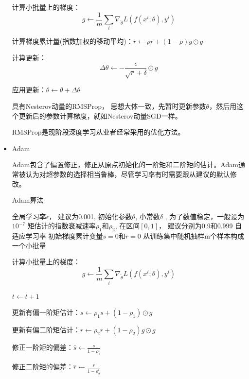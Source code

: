\begin{itemize}
\begin{algorithm}
\begin{algorithmic}
	计算小批量上的梯度：
	\begin{displaymath}
		g \leftarrow \frac{1}{m} \sum_{i}\nabla_{\tilde{\theta}}L(f(x^{i}; \theta), y^{i})
	\end{displaymath}
	
	计算梯度累计量(指数加权的移动平均)：$r \leftarrow \rho r + (1 - \rho) g \odot g$
	
	计算更新：
	\begin{displaymath}
	\Delta \theta \leftarrow - \frac{\epsilon}{\sqrt{r}+\delta} \odot g
	\end{displaymath}
	
	应用更新：$\theta \leftarrow \theta + \Delta \theta $
\end{algorithmic}
\end{algorithm}

具有Nesterov动量的RMSProp， 思想大体一致，先暂时更新参数$\theta$，然后用这个更新后的参数计算梯度，就如Nesterov动量SGD一样。

RMSProp是现阶段深度学习从业者经常采用的优化方法。

\item Adam

Adam包含了偏置修正，修正从原点初始化的一阶矩和二阶矩的估计。Adam通常被认为对超参数的选择相当鲁棒，尽管学习率有时需要跟从建议的默认修改。

\begin{algorithm}
\caption{Adam算法}
\begin{algorithmic}
\Require 全局学习率$\epsilon$， 建议为0.001, 初始化参数$\theta$, 小常数$\delta$ , 为了数值稳定，一般设为$10^{-7}$
\Require 矩估计的指数衰减速率$\rho_1$和$\rho_2$, 在区间$[0, 1]$， 建议分别为0.9和0.999
\Ensure 自适应学习率
\State 初始梯度累计变量$s=0$和$r=0$
\Repeat
	从训练集中随机抽样m个样本构成一个小批量
	
	计算小批量上的梯度：
	\begin{displaymath}
		g \leftarrow \frac{1}{m} \sum_{i}\nabla_{\tilde{\theta}}L(f(x^{i}; \theta), y^{i})
	\end{displaymath}
	
	$t \leftarrow t+1$
	
	更新有偏一阶矩估计：$s \leftarrow \rho_1 s + (1 - \rho_1) \odot g$
	
	更新有偏二阶矩估计：$r \leftarrow \rho_2 r + (1 - \rho_2) g \odot g$
	
	修正一阶矩的偏差：$\hat{s} \leftarrow \frac{s}{1 - \rho_1^t}$
	
	修正二阶矩的偏差：$\hat{r} \leftarrow \frac{r}{1 - \rho_2^t}$
	

\end{algorithmic}
\end{algorithm}
\end{itemize}
